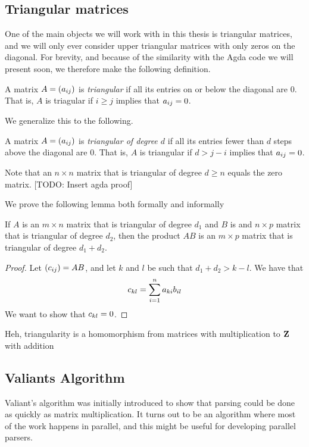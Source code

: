 \documentclass{article}
\begin{document}
\subsection{Triangular matrices}
One of the main objects we will work with in this thesis is triangular matrices, and we will only ever consider upper triangular matrices with only zeros on the diagonal. For brevity, and because of the similarity with the Agda code we will present soon, we therefore make the following definition.
\begin{Def}
  A matrix $A = (a_{ij})$ is \emph{triangular} if all its entries on or below the diagonal are $0$. That is, $A$ is triagular if $i \ge j$ implies that $a_{ij} = 0$.
\end{Def}
We generalize this to the following.
\begin{Def}
  A matrix $A = (a_{ij})$ is \emph{triangular of degree $d$} if all its entries fewer than $d$ steps above the diagonal are $0$. That is, $A$ is triangular if $d > j - i$ implies that $a_{ij} = 0$.
\end{Def}
\begin{Remark}
  Note that an $n \times n$ matrix that is triangular of degree $d \ge n$ equals the zero matrix. [TODO: Insert agda proof]
\end{Remark}

We prove the following lemma both formally and informally
\begin{Lemma}
  If $A$ is an $m \times n$ matrix that is triangular of degree $d_1$ and $B$ is and $n \times p$ matrix that is triangular of degree $d_2$, then the product $AB$ is an $m \times p$ matrix that is triangular of degree $d_1 + d_2$.
\end{Lemma}
\begin{proof}
  Let $(c_{ij}) = AB$, and let $k$ and $l$ be such that $d_1 + d_2 > k - l$. We have that 
\begin{equation}
  c_{kl} = \sum_{i = 1}^na_{ki}b_{il}
\end{equation}
 We want to show that $c_{kl} = 0$.

  
\end{proof}
Heh, triangularity is a homomorphism from matrices with multiplication to $\mathbf{Z}$ with addition
\subsection{Valiants Algorithm}
Valiant's algorithm was initially introduced to show that parsing could be done as quickly as matrix multiplication. It turns out to be an algorithm where most of the work happens in parallel, and this might be useful for developing parallel parsers.
\end{document}
